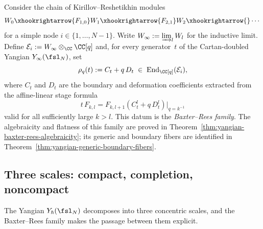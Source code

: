 \begin{definition}
\label{def:baxter-rees-chart}
Consider the chain of Kirillov--Reshetikhin modules
\begin{equation}\label{eq:KR-chain-baxter-rees}
 W_0 \xhookrightarrow{F_{1,0}} W_1 \xhookrightarrow{F_{2,1}}
 W_2 \xhookrightarrow{} \cdots
\end{equation}
for a simple node $i \in \{1,\dots,N-1\}$. Write
$W_\infty := \varinjlim_l W_l$ for the inductive limit. Define
$\mathcal{E}_i := W_\infty \otimes_{\CC} \CC[q]$ and, for every
generator~$t$ of the Cartan-doubled Yangian
$Y_\infty(\fsl_N)$, set
\begin{equation}\label{eq:baxter-rees-action}
 \rho_q(t) := C_t + q\,D_t
 \;\in\; \operatorname{End}_{\CC[q]}(\mathcal{E}_i),
\end{equation}
where $C_t$ and $D_t$ are the boundary and deformation coefficients
extracted from the affine-linear stage formula
\begin{equation}\label{eq:baxter-rees-stage}
 t\,F_{k,l} = F_{k,l+1}(C_t^l + q\,D_t^l)\big|_{q = k^{-1}}
\end{equation}
valid for all sufficiently large $k > l$. This datum is the
\emph{Baxter--Rees family}. The algebraicity and flatness of this family
are proved in Theorem~\ref{thm:yangian-baxter-rees-algebraicity}; its
generic and boundary fibers are identified in
Theorem~\ref{thm:yangian-generic-boundary-fibers}.
\end{definition}

\subsection{Three scales: compact, completion, noncompact}

The Yangian $Y_\hbar(\fsl_N)$ decomposes into three
concentric scales, and the Baxter--Rees family makes the passage
between them explicit.

